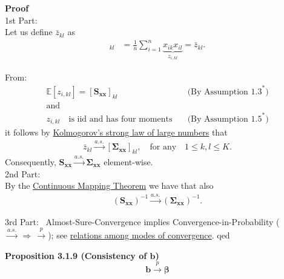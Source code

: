 \documentclass[
]{book}
\begin{document}
\textbf{Proof}\\
1st Part:\\
Let us define \(\bar{z}_{kl}\) as
\begin{align*}
[\mathbf{S}_{\mathbf{x}\mathbf{x}}]_{kl}&=\frac{1}{n}\sum_{i=1}^n\underbrace{x_{ik}x_{il}}_{z_{i,kl}}=\bar{z}_{kl}.
\end{align*}

From:
\[
\begin{array}{ll}
\mathbb{E}[z_{i,kl}]=[\mathbf{S}_{\mathbf{x}\mathbf{x}}]_{kl}&\quad\text{(By Assumption 1.3}^\ast)\\
\text{and}&\\
z_{i,kl}\quad\text{is iid and has four moments}      &\quad\text{(By Assumption 1.5}^\ast)
\end{array}
\]
it follows by \href{https://www.statlect.com/asymptotic-theory/law-of-large-numbers}{Kolmogorov's strong law of large numbers}
that
\begin{align*}
\bar{z}_{kl}\overset{a.s.}\longrightarrow \left[\boldsymbol{\Sigma}_{\mathbf{x}\mathbf{x}}\right]_{kl},\quad\text{for any}\quad 1\leq k,l\leq K.
\end{align*}
Consequently,
\(\mathbf{S}_{\mathbf{x}\mathbf{x}}\overset{a.s.}\longrightarrow\boldsymbol{\Sigma}_{\mathbf{x}\mathbf{x}}\)
element-wise.\\

2nd Part:\\
By the \href{https://www.statlect.com/asymptotic-theory/continuous-mapping-theorem}{Continuous Mapping Theorem}
we have that also
\begin{align*}
\left(\mathbf{S}_{\mathbf{x}\mathbf{x}}\right)^{-1}\overset{a.s.}\longrightarrow\left(\boldsymbol{\Sigma}_{\mathbf{x}\mathbf{x}}\right)^{-1}.
\end{align*}

3rd Part:~
Almost-Sure-Convergence implies Convergence-in-Probability
(\(\overset{a.s.}\longrightarrow \, \Rightarrow \, \overset{p}\longrightarrow\)); see \href{https://www.statlect.com/asymptotic-theory/relations-among-modes-of-convergence}{relations among modes of convergence}.
qed

\hfill\break

\textbf{Proposition 3.1.9 (Consistency of \(\mathbf{b}\))}
\[
\mathbf{b}\overset{p}\longrightarrow\boldsymbol{\beta}
\]
\end{document}
